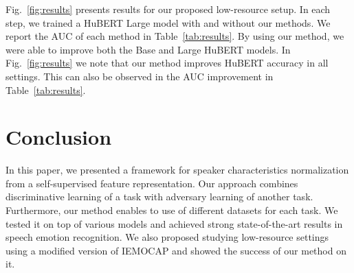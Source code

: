 \documentclass{article}
\renewcommand{\[}{\begin{eqnarray}}
\renewcommand{\]}{\end{eqnarray}}
\begin{document}
Fig.~\ref{fig:results} presents results for our proposed low-resource setup. In each step, we trained a HuBERT Large model with and without our methods.  We report the AUC of each method in Table~\ref{tab:results}. By using our method, we were able to improve both the Base and Large HuBERT models. In Fig.~\ref{fig:results} we note that our method improves HuBERT accuracy in all settings. This can also be observed in the AUC improvement in Table~\ref{tab:results}.

\vspace{-0.15cm}
\section{Conclusion}\label{sec:conclusions}
\vspace{-0.15cm}

In this paper, we presented a framework for speaker characteristics normalization from a self-supervised feature representation. Our approach combines discriminative learning of a task with adversary learning of another task. Furthermore, our method enables to use of different datasets for each task. We tested it on top of various models and achieved strong state-of-the-art results in speech emotion recognition. We also proposed studying low-resource settings using a modified version of IEMOCAP and showed the success of our method on it.


\clearpage

{\small


}
\end{document}
